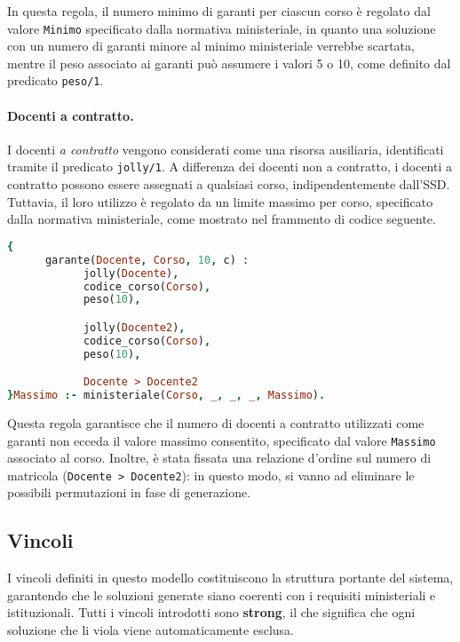 In questa regola, il numero minimo di garanti per ciascun corso è regolato dal valore \texttt{Minimo} 
specificato dalla normativa ministeriale, in quanto una soluzione con un numero di garanti minore al 
minimo ministeriale verrebbe scartata, mentre il peso associato ai garanti può assumere i valori 5 o 
10, come definito dal predicato \texttt{peso/1}.

\paragraph{Docenti a contratto.}
I docenti \textit{a contratto} vengono considerati come una risorsa ausiliaria, identificati tramite 
il predicato \texttt{jolly/1}. A differenza dei docenti non a contratto, i docenti a contratto possono 
essere assegnati a qualsiasi corso, indipendentemente dall'SSD. Tuttavia, il loro utilizzo è regolato 
da un limite massimo per corso, specificato dalla normativa ministeriale, come mostrato nel frammento
di codice seguente.

\begin{lstlisting}[language=prolog, caption=Generazione dei garanti a contratto.]
{     
      garante(Docente, Corso, 10, c) :
            jolly(Docente),
            codice_corso(Corso),
            peso(10),

            jolly(Docente2),
            codice_corso(Corso),
            peso(10),

            Docente > Docente2
}Massimo :- ministeriale(Corso, _, _, _, Massimo).
\end{lstlisting}

Questa regola garantisce che il numero di docenti a contratto utilizzati come garanti non ecceda il 
valore massimo consentito, specificato dal valore \texttt{Massimo} associato al corso.
Inoltre, è stata fissata una relazione d'ordine sul numero di matricola (\texttt{Docente > Docente2}): 
in questo modo, si vanno ad eliminare le possibili permutazioni in fase di generazione.


\subsection{Vincoli}\label{sec:constraints}

I vincoli definiti in questo modello costituiscono la struttura portante del sistema, garantendo 
che le soluzioni generate siano coerenti con i requisiti ministeriali e istituzionali. 
Tutti i vincoli introdotti sono \textbf{strong}, il che significa che ogni soluzione che li 
viola viene automaticamente esclusa. 


